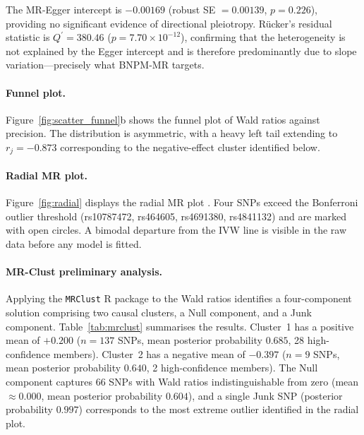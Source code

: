 \documentclass[12pt,a4paper]{article}
\begin{document}
The MR-Egger intercept is $-0.00169$ (robust SE $= 0.00139$, $p = 0.226$),
providing no significant evidence of directional pleiotropy.  R\"{u}cker's
residual statistic is $Q^{\prime} = 380.46$ ($p = 7.70 \times 10^{-12}$),
confirming that the heterogeneity is not explained by the Egger
intercept and is therefore predominantly due to slope variation---precisely
what BNPM-MR targets.

\paragraph{Funnel plot.}
Figure~\ref{fig:scatter_funnel}b shows the funnel plot of Wald ratios
against precision.  The distribution is asymmetric, with a heavy left tail
extending to $r_{j} = -0.873$ corresponding to the negative-effect cluster
identified below.

\paragraph{Radial MR plot.}
Figure~\ref{fig:radial} displays the radial MR plot \citep{Bowden2018}.
Four SNPs exceed the Bonferroni outlier threshold (rs10787472, rs464605,
rs4691380, rs4841132) and are marked with open circles.  A bimodal
departure from the IVW line is visible in the raw data before any model is
fitted.

\paragraph{MR-Clust preliminary analysis.}
Applying the \texttt{MRClust} R package \citep{Foley2019} to the Wald
ratios identifies a four-component solution comprising two causal
clusters, a Null component, and a Junk component.
Table~\ref{tab:mrclust} summarises the results.
Cluster~1 has a positive mean of $+0.200$ ($n = 137$ SNPs,
mean posterior probability $0.685$, 28 high-confidence members).
Cluster~2 has a negative mean of $-0.397$ ($n = 9$ SNPs,
mean posterior probability $0.640$, 2 high-confidence members).
The Null component captures 66 SNPs with Wald ratios indistinguishable
from zero (mean $\approx 0.000$, mean posterior probability $0.604$),
and a single Junk SNP (posterior probability $0.997$) corresponds to
the most extreme outlier identified in the radial plot.
\end{document}
